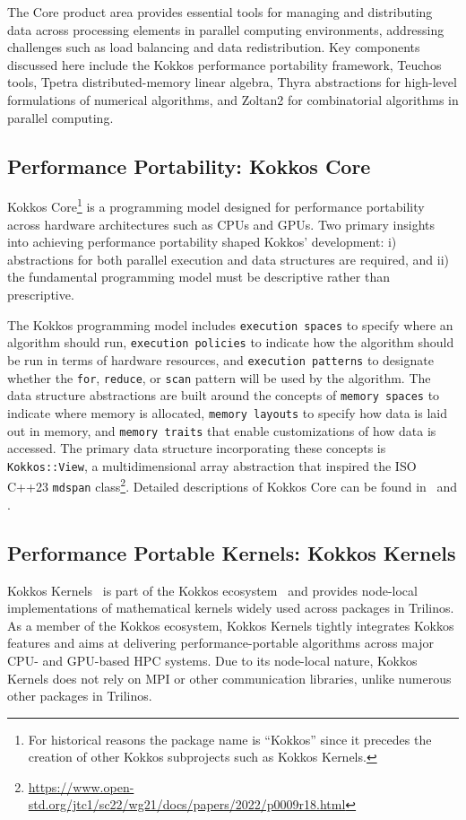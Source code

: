 
The Core product area provides essential tools for managing and distributing data across processing elements in parallel computing environments, addressing challenges such as load balancing and data redistribution. Key components discussed here include the Kokkos performance portability framework, Teuchos tools, Tpetra distributed-memory linear algebra, Thyra abstractions for high-level formulations of numerical algorithms, and Zoltan2 for combinatorial algorithms in parallel computing.

\subsection{Performance Portability: Kokkos Core}\label{subsec:kokkos}
Kokkos Core\footnote{For historical reasons the package name is ``Kokkos'' since it precedes the creation of other Kokkos subprojects such as Kokkos Kernels.} is a programming model designed for performance portability across hardware architectures such as CPUs and GPUs. Two primary insights into achieving performance portability shaped Kokkos' development:
i) abstractions for both parallel execution and data structures are required, and
ii) the fundamental programming model must be descriptive rather than prescriptive.

The Kokkos programming model includes \texttt{execution spaces} to specify where an algorithm should run, \texttt{execution policies} to indicate how the algorithm should be run in terms of hardware resources, and \texttt{execution patterns} to designate whether the \texttt{for}, \texttt{reduce}, or \texttt{scan} pattern will be used by the algorithm. The data structure abstractions are built around the concepts of \texttt{memory spaces} to indicate where memory is allocated, \texttt{memory layouts} to specify how data is laid out in memory, and \texttt{memory traits} that enable customizations of how data is accessed. The primary data structure incorporating
these concepts is \texttt{Kokkos::View}, a multidimensional array abstraction that inspired
the ISO C++23 \texttt{mdspan} class\footnote{\url{https://www.open-std.org/jtc1/sc22/wg21/docs/papers/2022/p0009r18.html}}. Detailed descriptions of Kokkos Core can be found
in~\cite{edwards2014} and \cite{trott2022kokkos}.

\subsection{Performance Portable Kernels: Kokkos Kernels}\label{subsec:kk}
Kokkos Kernels~\cite{rajamanickam2021kokkoskernels} is part of the Kokkos ecosystem~\cite{trott2021kokkos} and provides node-local implementations of mathematical kernels widely used across packages in Trilinos. As a member of the Kokkos ecosystem, Kokkos Kernels tightly integrates Kokkos features and aims at delivering performance\hyp{}portable algorithms across major CPU- and GPU-based HPC systems. Due to its node-local nature, Kokkos Kernels does not rely on MPI or other communication libraries, unlike numerous other packages in Trilinos.

